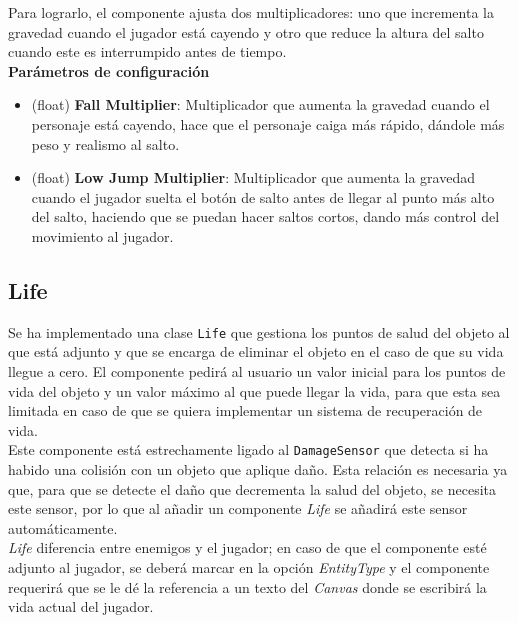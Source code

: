 Para lograrlo, el componente ajusta dos multiplicadores: uno que incrementa la gravedad cuando el jugador está cayendo y otro que reduce la altura del salto cuando este es interrumpido antes de tiempo.\\

\textbf{Parámetros de configuración}
\begin{itemize}
	\item (float) \textbf{Fall Multiplier}: Multiplicador que aumenta la gravedad cuando el personaje está cayendo, hace que el personaje caiga más rápido, dándole más peso y realismo al salto.
	\item (float) \textbf{Low Jump Multiplier}: Multiplicador que aumenta la gravedad cuando el jugador suelta el botón de salto antes de llegar al punto más alto del salto, haciendo que se puedan hacer saltos cortos, dando más control del movimiento al jugador.
\end{itemize}

\subsection{Life} \label{sec:life}

Se ha implementado una clase \texttt{Life} que gestiona los puntos de salud del objeto al que está adjunto y que se encarga de eliminar el objeto en el caso de que su vida llegue a cero. El componente pedirá al usuario un valor inicial para los puntos de vida del objeto y un valor máximo al que puede llegar la vida, para que esta sea limitada en caso de que se quiera implementar un sistema de recuperación de vida.\\

Este componente está estrechamente ligado al \texttt{DamageSensor} que detecta si ha habido una colisión con un objeto que aplique daño. Esta relación es necesaria ya que, para que se detecte el daño que decrementa la salud del objeto, se necesita este sensor, por lo que al añadir un componente \textit{Life} se añadirá este sensor automáticamente.\\

\textit{Life} diferencia entre enemigos y el jugador; en caso de que el componente esté adjunto al jugador, se deberá marcar en la opción \textit{EntityType} y el componente requerirá que se le dé la referencia a un texto del \textit{Canvas} donde se escribirá la vida actual del jugador.\\

